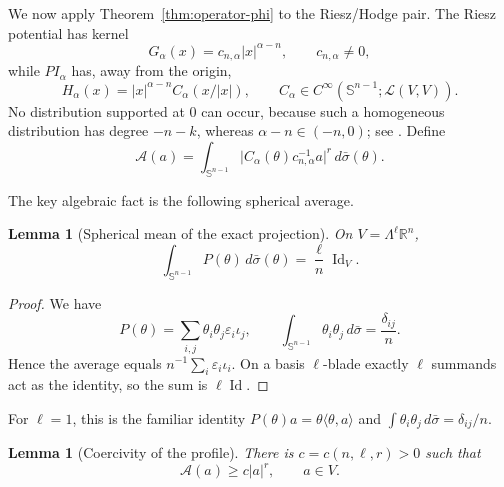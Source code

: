 \documentclass[10pt,a4paper]{amsart}
\numberwithin{equation}{section}
\newtheorem{lemma}[theorem]{Lemma}
\newcommand{\R}{\mathbb R}
\newcommand{\Sph}{\mathbb S}
\newcommand{\cL}{\mathcal L}
\newcommand{\eps}{\varepsilon}
\newcommand{\ii}{\iota}
\newcommand{\Id}{\operatorname{Id}}
\begin{document}
We now apply Theorem~\ref{thm:operator-phi} to the Riesz/Hodge pair.
The Riesz potential has kernel
\begin{equation}\label{eq:riesz-kernel}
 G_\alpha(x)=c_{n,\alpha}|x|^{\alpha-n},\qquad c_{n,\alpha}\ne0,
\end{equation}
while $P I_\alpha$ has, away from the origin,
\begin{equation}\label{eq:projected-kernel}
 H_\alpha(x)=|x|^{\alpha-n}C_\alpha(x/|x|),
 \qquad C_\alpha\in C^\infty(\Sph^{n-1};\cL(V,V)).
\end{equation}
No distribution supported at $0$ can occur, because such a homogeneous
distribution has degree $-n-k$, whereas $\alpha-n\in(-n,0)$; see
\cite[Chapters~II and V]{Stein70}.  Define
\begin{equation}\label{eq:profile}
 \mathcal A(a)=\int_{\Sph^{n-1}}
 \bigl|C_\alpha(\theta)c_{n,\alpha}^{-1}a\bigr|^r\,d\bar\sigma(\theta).
\end{equation}

The key algebraic fact is the following spherical average.

\begin{lemma}[Spherical mean of the exact projection]\label{lem:average-P}
On $V=\Lambda^\ell\R^n$,
\begin{equation}\label{eq:average-P}
 \int_{\Sph^{n-1}}P(\theta)\,d\bar\sigma(\theta)
 =\frac\ell n\Id_V.
\end{equation}
\end{lemma}

\begin{proof}
We have
\[
 P(\theta)=\sum_{i,j}\theta_i\theta_j\eps_i\ii_j,
 \qquad
 \int_{\Sph^{n-1}}\theta_i\theta_j\,d\bar\sigma=\frac{\delta_{ij}}n.
\]
Hence the average equals $n^{-1}\sum_i\eps_i\ii_i$.  On a basis
$\ell$-blade exactly $\ell$ summands act as the identity, so the sum is
$\ell\Id$.
\end{proof}

For $\ell=1$, this is the familiar identity
$P(\theta)a=\theta\langle\theta,a\rangle$ and
$\int\theta_i\theta_j\,d\bar\sigma=\delta_{ij}/n$.

\begin{lemma}[Coercivity of the profile]\label{lem:profile-coercive}
There is $c=c(n,\ell,r)>0$ such that
\begin{equation}\label{eq:profile-coercive}
 \mathcal A(a)\ge c|a|^r,\qquad a\in V.
\end{equation}
\end{lemma}
\end{document}
